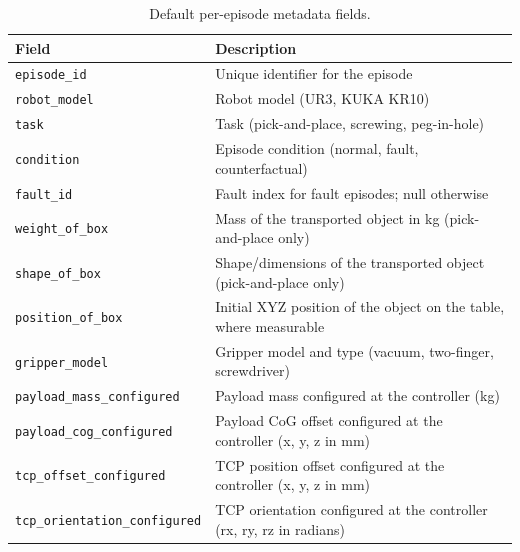 \begin{table}[htbp]
    \centering
    \caption{Default per-episode metadata fields.}
    \label{tab:metadata}
    \small
    \begin{tabular}{lp{9.5cm}}
        \toprule
        Field                                 & Description                                                          \\
        \midrule
        \texttt{episode\_id}                  & Unique identifier for the episode                                    \\
        \texttt{robot\_model}                 & Robot model (UR3, KUKA KR10)                                         \\
        \texttt{task}                         & Task (pick-and-place, screwing, peg-in-hole)                         \\
        \texttt{condition}                    & Episode condition (normal, fault, counterfactual)                    \\
        \texttt{fault\_id}                    & Fault index for fault episodes; null otherwise                       \\
        \texttt{weight\_of\_box}              & Mass of the transported object in kg (pick-and-place only)           \\
        \texttt{shape\_of\_box}               & Shape/dimensions of the transported object (pick-and-place only)     \\
        \texttt{position\_of\_box}            & Initial XYZ position of the object on the table, where measurable    \\
        \texttt{gripper\_model}               & Gripper model and type (vacuum, two-finger, screwdriver)             \\
        \texttt{payload\_mass\_configured}    & Payload mass configured at the controller (kg)                       \\
        \texttt{payload\_cog\_configured}     & Payload CoG offset configured at the controller (x, y, z in mm)      \\
        \texttt{tcp\_offset\_configured}      & TCP position offset configured at the controller (x, y, z in mm)     \\
        \texttt{tcp\_orientation\_configured} & TCP orientation configured at the controller (rx, ry, rz in radians) \\
        \bottomrule
    \end{tabular}
\end{table}

